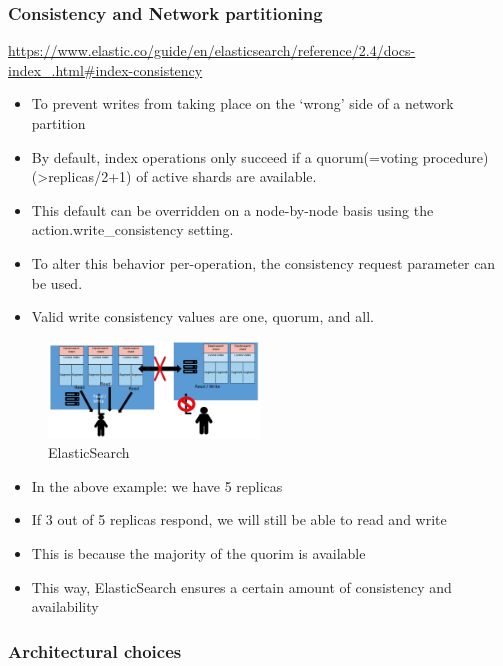 \documentclass{article}
\begin{document}
\subsubsection{Consistency and Network partitioning}

\url{https://www.elastic.co/guide/en/elasticsearch/reference/2.4/docs-index\_.html#index-consistency}

\begin{itemize}
    \item To prevent writes from taking place on the `wrong' side of a network partition
    \item By default, index operations only succeed if a quorum(=voting procedure) (>replicas/2+1) of active shards are available. 
    \item This default can be overridden on a node-by-node basis using the action.write\_consistency setting. 
    \item To alter this behavior per-operation, the consistency request parameter can be used.
    \item Valid write consistency values are one, quorum, and all.
\end{itemize}


\begin{figure}[H]
    \centering
    \includegraphics[width=0.5\textwidth]{elasticsearch-distributed.png}
    \caption{ElasticSearch }
\end{figure}

\begin{itemize}
    \item In the above example: we have 5 replicas
    \item If 3 out of 5 replicas respond, we will still be able to read and write 
    \item This is because the majority of the quorim is available
    \item This way, ElasticSearch ensures a certain amount of consistency and availability
\end{itemize}

\subsubsection{Architectural choices}
\end{document}
